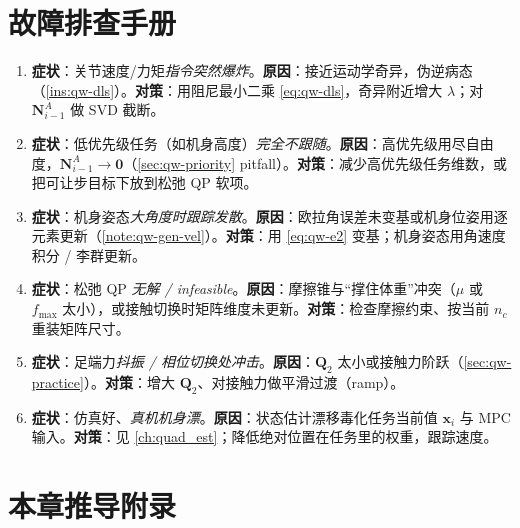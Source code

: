 \section*{故障排查手册}
\begin{enumerate}
  \item \textbf{症状}：关节速度/力矩\emph{指令突然爆炸}。\textbf{原因}：接近运动学奇异，伪逆病态（\cref{ins:qw-dls}）。\textbf{对策}：用阻尼最小二乘 \cref{eq:qw-dls}，奇异附近增大 $\lambda$；对 $\boldsymbol{N}_{i-1}^A$ 做 SVD 截断。
  \item \textbf{症状}：低优先级任务（如机身高度）\emph{完全不跟随}。\textbf{原因}：高优先级用尽自由度，$\boldsymbol{N}_{i-1}^A\to\mathbf{0}$（\cref{sec:qw-priority} pitfall）。\textbf{对策}：减少高优先级任务维数，或把可让步目标下放到松弛 QP 软项。
  \item \textbf{症状}：机身姿态\emph{大角度时跟踪发散}。\textbf{原因}：欧拉角误差未变基或机身位姿用逐元素更新（\cref{note:qw-gen-vel}）。\textbf{对策}：用 \cref{eq:qw-e2} 变基；机身姿态用角速度积分 / 李群更新。
  \item \textbf{症状}：松弛 QP \emph{无解 / infeasible}。\textbf{原因}：摩擦锥与“撑住体重”冲突（$\mu$ 或 $f_{\max}$ 太小），或接触切换时矩阵维度未更新。\textbf{对策}：检查摩擦约束、按当前 $n_c$ 重装矩阵尺寸。
  \item \textbf{症状}：足端力\emph{抖振 / 相位切换处冲击}。\textbf{原因}：$\boldsymbol{Q}_2$ 太小或接触力阶跃（\cref{sec:qw-practice}）。\textbf{对策}：增大 $\boldsymbol{Q}_2$、对接触力做平滑过渡（ramp）。
  \item \textbf{症状}：仿真好、\emph{真机机身漂}。\textbf{原因}：状态估计漂移毒化任务当前值 $\boldsymbol{x}_i$ 与 MPC 输入。\textbf{对策}：见 \cref{ch:quad_est}；降低绝对位置在任务里的权重，跟踪速度。
\end{enumerate}

\section{本章推导附录}
\label{sec:qw-appendix}

